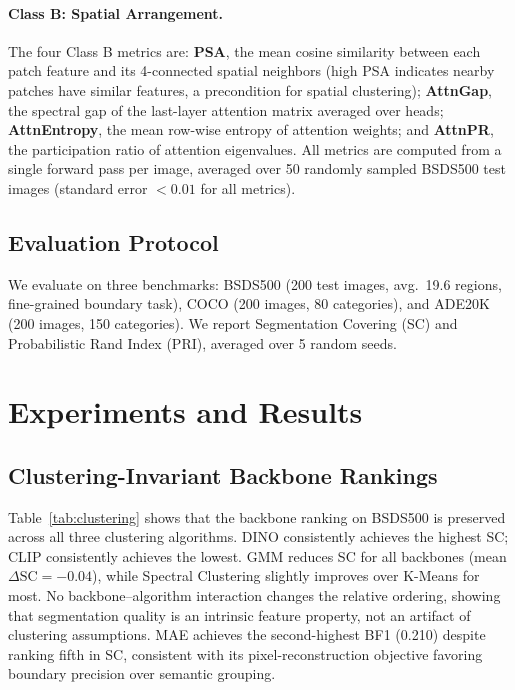 \documentclass[runningheads]{llncs}
\begin{document}
\paragraph{Class B: Spatial Arrangement.} The four Class B metrics are: \textbf{PSA}, the mean cosine similarity between each patch feature and its 4-connected spatial neighbors (high PSA indicates nearby patches have similar features, a precondition for spatial clustering); \textbf{AttnGap}, the spectral gap of the last-layer attention matrix averaged over heads; \textbf{AttnEntropy}, the mean row-wise entropy of attention weights; and \textbf{AttnPR}, the participation ratio of attention eigenvalues. All metrics are computed from a single forward pass per image, averaged over 50 randomly sampled BSDS500 test images (standard error $< 0.01$ for all metrics).

\subsection{Evaluation Protocol}
We evaluate on three benchmarks: BSDS500 \cite{arbelaez2011} (200 test images, avg.\ 19.6 regions, fine-grained boundary task), COCO \cite{lin2014coco} (200 images, 80 categories), and ADE20K \cite{zhou2017ade20k} (200 images, 150 categories). We report Segmentation Covering (SC) and Probabilistic Rand Index (PRI), averaged over 5 random seeds.

\section{Experiments and Results}

\subsection{Clustering-Invariant Backbone Rankings}
\label{sec:clustering}

Table~\ref{tab:clustering} shows that the backbone ranking on BSDS500 is preserved across all three clustering algorithms. DINO consistently achieves the highest SC; CLIP consistently achieves the lowest. GMM reduces SC for all backbones (mean $\Delta\text{SC} = -0.04$), while Spectral Clustering slightly improves over K-Means for most. No backbone--algorithm interaction changes the relative ordering, showing that segmentation quality is an intrinsic feature property, not an artifact of clustering assumptions. MAE achieves the second-highest BF1 (0.210) despite ranking fifth in SC, consistent with its pixel-reconstruction objective favoring boundary precision over semantic grouping.
\end{document}

